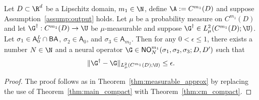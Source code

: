 \begin{theorem}
\label{thm:cm_measurable_approx}
Let \(D \subset \R^d\) be a Lipschitz domain, \(m_1 \in \N\), define
\(\A := C^{m_1}(D)\) and suppose Assumption~\ref{assump:output} holds. Let \(\mu\)
be a probability measure on \(C^{m_1}(D)\) and let 
\(\G^\dagger : C^{m_1}(D) \to \U\) be \(\mu\)-measurable and suppose \(\G^\dagger \in L^2_\mu (C^{m_1}(D);\U)\).
Let \(\sigma_1 \in \mathsf{A}^{\emph{\text{L}}}_0 \cap \mathsf{BA}\), \(\sigma_2 \in \mathsf{A}_0\), and \(\sigma_3 \in \mathsf{A}_{m_2}\).
Then for any \(0 < \epsilon \leq 1\), there exists a number \(N \in \N\) and a neural operator 
\(\G \in \mathsf{NO}_{N}^{m_1}(\sigma_1,\sigma_2,\sigma_3;D,D')\) such that
\[\|\G^\dagger  - \G  \|_{L^2_\mu(C^{m_1}(D);\U)} \leq \epsilon.\]
\end{theorem}
\begin{proof}
The proof follows as in Theorem~\ref{thm:measurable_approx} by replacing the use of Theorem~\ref{thm:main_compact}
with Theorem~\ref{thm:cm_compact}.
\end{proof}





\iffalse 

